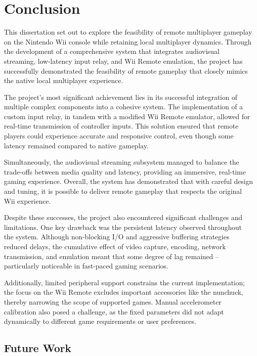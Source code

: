 \chapter{Conclusion}
\label{chapter:conclusion}

This dissertation set out to explore the feasibility of remote multiplayer
gameplay on the Nintendo Wii console while retaining local multiplayer dynamics.
Through the development of a comprehensive system that integrates audiovisual
streaming, low-latency input relay, and Wii Remote emulation, the project has
successfully demonstrated the feasibility of remote gameplay that closely mimics
the native local multiplayer experience.

The project’s most significant achievement lies in its successful integration of
multiple complex components into a cohesive system. The implementation of a
custom input relay, in tandem with a modified Wii Remote emulator, allowed for
real-time transmission of controller inputs. This solution ensured that remote
players could experience accurate and responsive control, even though some
latency remained compared to native gameplay.

Simultaneously, the audiovisual
streaming subsystem managed to balance the trade-offs between media quality and
latency, providing an immersive, real-time gaming experience. Overall, the
system has demonstrated that with careful design and tuning, it is possible to
deliver remote gameplay that respects the original Wii experience.

Despite these successes, the project also encountered significant challenges and
limitations. One key drawback was the persistent latency observed throughout the
system. Although non-blocking I/O and aggressive buffering strategies reduced
delays, the cumulative effect of video capture, encoding, network transmission,
and emulation meant that some degree of lag remained -- particularly noticeable
in fast-paced gaming scenarios.

Additionally, limited peripheral support
constrains the current implementation; the focus on the Wii Remote excludes
important accessories like the nunchuck, thereby narrowing the scope of
supported games. Manual accelerometer calibration also posed a challenge, as the
fixed parameters did not adapt dynamically to different game requirements or
user preferences.

\section{Future Work}

